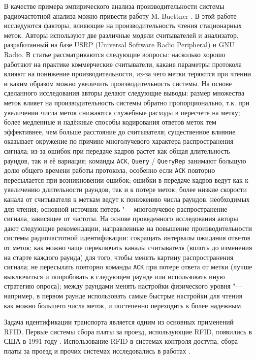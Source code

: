 В качестве примера эмпирического анализа производительности системы радиочастотной анализа можно привести работу M. Buettner \cite{Buettner2008}. В этой работе исследуются факторы, влияющие на производительность чтения стационарных меток. Авторы используют две различные модели считывателей и анализатор, разработанный на базе USRP (Universal Software Radio Peripheral) и GNU Radio. В статье рассматриваются следующие вопросы: насколько хорошо работают на практике коммерческие считыватели, какаие параметры протокола влияют на понижение производительности, из-за чего метки теряются при чтении и каким образом можно увеличить производительность системы. На основе сделанного исследования авторы делают следующие выводы: размер множества меток влияет на производительность системы обратно пропорционально, т.к. при увеличении числа меток снижаются служебные расходы в пересчете на метку; более медленные и надёжные способы кодирования ответов меток тем эффективнее, чем больше расстояние до считывателя; существенное влияние оказывает окружение по причине многолучевого характера распространения сигнала; из-за ошибок при передаче кадров растет как общая длительность раундов, так и её вариация; команды \texttt{ACK}, \texttt{Query} / \texttt{QueryRep} занимают большую долю общего времени работы протокола, особенно если \texttt{ACK} повторно пересылается при возникновении ошибок; ошибки в передаче кадров ведут как к увеличению длительности раундов, так и к потере меток; более низкие скорости канала от считывателя к меткам ведут к понижению числа раундов, необходимых для чтения; основной источник потерь "--- многолучевое распространение сигнала, зависящее от частоты. На основе проведенного исследования авторы дают следующие рекомендации, направленные на повышение производительности системы радиочастотной идентификации: сокращать интервалы ожидания ответов от меток; как можно чаще переключать каналы считывателя (вплоть до изменения на старте каждого раунда) для того, чтобы менять картину распространения сигнала; не пересылать повторно команды \texttt{ACK} при потере ответа от метки (лучше выключиться и попробовать в следующем раунде или использовать иную стратегию опроса); между раундами менять настройки физического уровня "--- например, в первом раунде использовать самые быстрые настройки для чтения как можно большего числа меток, и постепенно переходить к более надежным.

Задача идентификации транспорта является одним из основных применений RFID. Первые системы сбора платы за проезд, использующие RFID, появились в США в 1991 году \cite{Landt2001}. Использование RFID в системах контроля доступа, сбора платы за проезд и прочих системах исследовались в работах \cite{Karmakar2013, Blythe99, Khan2011, Yoon2008, Fawzi2011, Tseng2007}.

